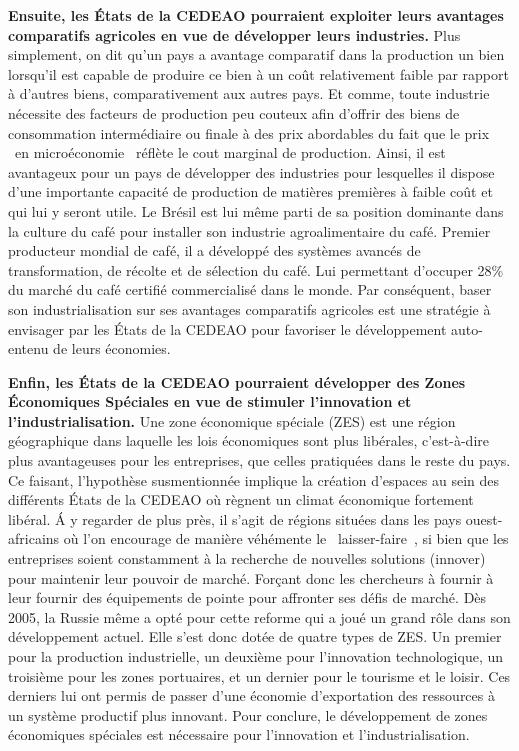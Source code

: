 	\hspace*{0.5cm}\textbf{Ensuite, les \'Etats de la CEDEAO pourraient exploiter leurs avantages comparatifs agricoles en vue de développer leurs industries.} Plus simplement, on dit qu'un pays a avantage comparatif dans la production un bien lorsqu'il est capable de produire ce bien à un coût relativement faible par rapport à d'autres biens, comparativement aux autres pays. Et comme, toute industrie nécessite des facteurs de production peu couteux afin d'offrir des biens de consommation intermédiaire ou finale à des prix abordables du fait que le prix \textendash\ en microéconomie \textendash\ réflète le cout marginal de production. Ainsi, il est avantageux pour un pays de développer des industries pour lesquelles il dispose d'une importante capacité de production de matières premières à faible coût et qui lui y seront utile. Le Brésil est lui même parti de sa position dominante dans la culture du café pour installer son industrie agroalimentaire du café. Premier producteur mondial de café, il a développé des systèmes avancés de transformation, de récolte et de sélection du café. Lui permettant d'occuper 28\% du marché du café certifié commercialisé dans le monde. Par conséquent, baser son industrialisation sur ses avantages comparatifs agricoles est une stratégie à envisager par les \'Etats de la CEDEAO pour favoriser le développement auto-entenu de leurs économies.
	
	\hspace*{0.5cm}\textbf{Enfin, les \'Etats de la CEDEAO pourraient développer des Zones \'Economiques Spéciales en vue de stimuler l'innovation et l'industrialisation.} Une zone économique spéciale (ZES) est une région géographique dans laquelle les lois économiques sont plus libérales, \mbox{c'est-à-dire} plus avantageuses pour les entreprises, que celles pratiquées dans le reste du pays. Ce faisant, l'hypothèse susmentionnée implique la création d'espaces au sein des différents \'Etats de la CEDEAO où règnent un climat économique fortement libéral. \'A y regarder de plus près, il s'agit de régions situées dans les pays ouest-africains où l'on encourage de manière véhémente le \mbox{\guillemetleft\ laisser-faire \guillemetright}, si bien que les entreprises soient constamment à la recherche de nouvelles solutions (innover) pour maintenir leur pouvoir de marché. Forçant donc les chercheurs à fournir à leur fournir des équipements de pointe pour affronter ses défis de marché. Dès 2005, la Russie même a opté pour cette reforme qui a joué un grand rôle dans son développement actuel. Elle s'est donc dotée de quatre types de ZES. Un premier pour la production industrielle, un deuxième pour l'innovation technologique, un troisième pour les zones portuaires, et un dernier pour le tourisme et le loisir. Ces derniers lui ont permis de passer d'une économie d'exportation des ressources à un système productif plus innovant. Pour conclure, le développement de zones économiques spéciales est nécessaire pour l'innovation et l'industrialisation.\\
	
